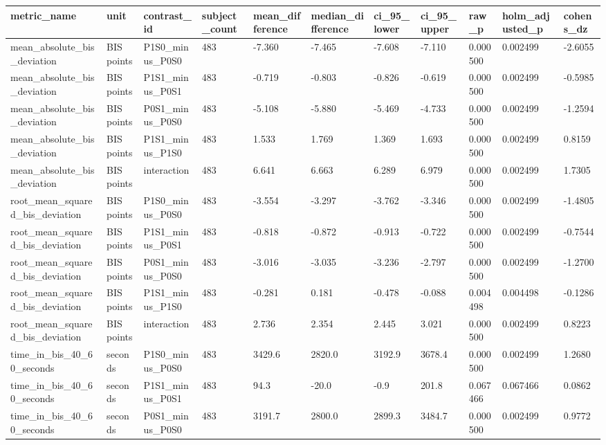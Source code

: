\begin{tabular}{lllllllllll}
\hline
metric\_name & unit & contrast\_id & subject\_count & mean\_difference & median\_difference & ci\_95\_lower & ci\_95\_upper & raw\_p & holm\_adjusted\_p & cohens\_dz \\
\hline
mean\_absolute\_bis\_deviation & BIS points & P1S0\_minus\_P0S0 & 483 & -7.360 & -7.465 & -7.608 & -7.110 & 0.000500 & 0.002499 & -2.6055 \\
mean\_absolute\_bis\_deviation & BIS points & P1S1\_minus\_P0S1 & 483 & -0.719 & -0.803 & -0.826 & -0.619 & 0.000500 & 0.002499 & -0.5985 \\
mean\_absolute\_bis\_deviation & BIS points & P0S1\_minus\_P0S0 & 483 & -5.108 & -5.880 & -5.469 & -4.733 & 0.000500 & 0.002499 & -1.2594 \\
mean\_absolute\_bis\_deviation & BIS points & P1S1\_minus\_P1S0 & 483 & 1.533 & 1.769 & 1.369 & 1.693 & 0.000500 & 0.002499 & 0.8159 \\
mean\_absolute\_bis\_deviation & BIS points & interaction & 483 & 6.641 & 6.663 & 6.289 & 6.979 & 0.000500 & 0.002499 & 1.7305 \\
root\_mean\_squared\_bis\_deviation & BIS points & P1S0\_minus\_P0S0 & 483 & -3.554 & -3.297 & -3.762 & -3.346 & 0.000500 & 0.002499 & -1.4805 \\
root\_mean\_squared\_bis\_deviation & BIS points & P1S1\_minus\_P0S1 & 483 & -0.818 & -0.872 & -0.913 & -0.722 & 0.000500 & 0.002499 & -0.7544 \\
root\_mean\_squared\_bis\_deviation & BIS points & P0S1\_minus\_P0S0 & 483 & -3.016 & -3.035 & -3.236 & -2.797 & 0.000500 & 0.002499 & -1.2700 \\
root\_mean\_squared\_bis\_deviation & BIS points & P1S1\_minus\_P1S0 & 483 & -0.281 & 0.181 & -0.478 & -0.088 & 0.004498 & 0.004498 & -0.1286 \\
root\_mean\_squared\_bis\_deviation & BIS points & interaction & 483 & 2.736 & 2.354 & 2.445 & 3.021 & 0.000500 & 0.002499 & 0.8223 \\
time\_in\_bis\_40\_60\_seconds & seconds & P1S0\_minus\_P0S0 & 483 & 3429.6 & 2820.0 & 3192.9 & 3678.4 & 0.000500 & 0.002499 & 1.2680 \\
time\_in\_bis\_40\_60\_seconds & seconds & P1S1\_minus\_P0S1 & 483 & 94.3 & -20.0 & -0.9 & 201.8 & 0.067466 & 0.067466 & 0.0862 \\
time\_in\_bis\_40\_60\_seconds & seconds & P0S1\_minus\_P0S0 & 483 & 3191.7 & 2800.0 & 2899.3 & 3484.7 & 0.000500 & 0.002499 & 0.9772 \\

\end{tabular}
